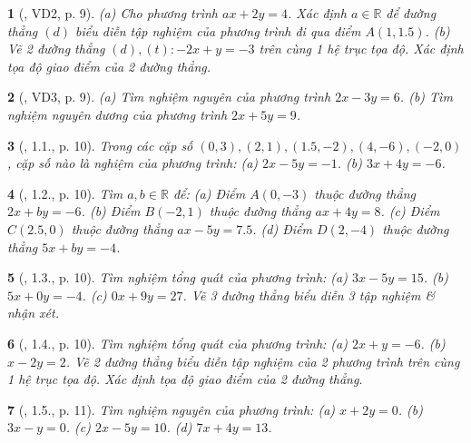 \documentclass{article}
\newtheorem{baitoan}{}
\begin{document}
\begin{baitoan}[\cite{Binh_boi_duong_Toan_9_tap_2}, VD2, p. 9]
	(a) Cho phương trình $ax + 2y = 4$. Xác định $a\in\mathbb{R}$ để đường thẳng $(d)$ biểu diễn tập nghiệm của phương trình đi qua điểm $A(1,1.5)$. (b) Vẽ 2 đường thẳng $(d),(t):-2x + y = -3$ trên cùng 1 hệ trục tọa độ. Xác định tọa độ giao điểm của 2 đường thẳng.
\end{baitoan}

\begin{baitoan}[\cite{Binh_boi_duong_Toan_9_tap_2}, VD3, p. 9]
	(a) Tìm nghiệm nguyên của phương trình $2x - 3y = 6$. (b) Tìm nghiệm nguyên dương của phương trình $2x + 5y = 9$.
\end{baitoan}

\begin{baitoan}[\cite{Binh_boi_duong_Toan_9_tap_2}, 1.1., p. 10]
	Trong các cặp số $(0,3),(2,1),(1.5,-2),(4,-6),(-2,0)$, cặp số nào là nghiệm của phương trình: (a) $2x - 5y = -1$. (b) $3x + 4y = -6$.
\end{baitoan}

\begin{baitoan}[\cite{Binh_boi_duong_Toan_9_tap_2}, 1.2., p. 10]
	Tìm $a,b\in\mathbb{R}$ để: (a) Điểm $A(0,-3)$ thuộc đường thẳng $2x + by = -6$. (b) Điểm $B(-2,1)$ thuộc đường thẳng $ax + 4y = 8$. (c) Điểm $C(2.5,0)$ thuộc đường thẳng $ax - 5y = 7.5$. (d) Điểm $D(2,-4)$ thuộc đường thẳng $5x + by = -4$.
\end{baitoan}

\begin{baitoan}[\cite{Binh_boi_duong_Toan_9_tap_2}, 1.3., p. 10]
	Tìm nghiệm tổng quát của phương trình: (a) $3x - 5y = 15$. (b) $5x + 0y = -4$. (c) $0x + 9y = 27$. Vẽ 3 đường thẳng biểu diễn 3 tập nghiệm \& nhận xét.
\end{baitoan}

\begin{baitoan}[\cite{Binh_boi_duong_Toan_9_tap_2}, 1.4., p. 10]
	Tìm nghiệm tổng quát của phương trình: (a) $2x + y = -6$. (b) $x - 2y = 2$. Vẽ 2 đường thẳng biểu diễn tập nghiệm của 2 phương trình trên cùng 1 hệ trục tọa độ. Xác định tọa độ giao điểm của 2 đường thẳng.
\end{baitoan}

\begin{baitoan}[\cite{Binh_boi_duong_Toan_9_tap_2}, 1.5., p. 11]
	Tìm nghiệm nguyên của phương trình: (a) $x + 2y = 0$. (b) $3x - y = 0$. (c) $2x - 5y = 10$. (d) $7x + 4y = 13$.
\end{baitoan}
\end{document}
